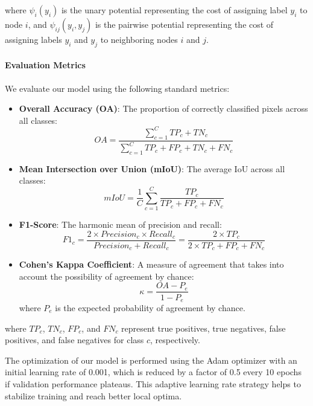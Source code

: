 \documentclass[conference]{IEEEtran}
\begin{document}
where $\psi_i(y_i)$ is the unary potential representing the cost of assigning label $y_i$ to node $i$, and $\psi_{ij}(y_i, y_j)$ is the pairwise potential representing the cost of assigning labels $y_i$ and $y_j$ to neighboring nodes $i$ and $j$.

\paragraph{Evaluation Metrics}
We evaluate our model using the following standard metrics:

\begin{itemize}
    \item \textbf{Overall Accuracy (OA)}: The proportion of correctly classified pixels across all classes:
    \begin{equation}
    OA = \frac{\sum_{c=1}^{C} TP_c + TN_c}{\sum_{c=1}^{C} TP_c + FP_c + TN_c + FN_c}
    \end{equation}
    
    \item \textbf{Mean Intersection over Union (mIoU)}: The average IoU across all classes:
    \begin{equation}
    mIoU = \frac{1}{C} \sum_{c=1}^{C} \frac{TP_c}{TP_c + FP_c + FN_c}
    \end{equation}
    
    \item \textbf{F1-Score}: The harmonic mean of precision and recall:
    \begin{equation}
    F1_c = \frac{2 \times Precision_c \times Recall_c}{Precision_c + Recall_c} = \frac{2 \times TP_c}{2 \times TP_c + FP_c + FN_c}
    \end{equation}
    
    \item \textbf{Cohen's Kappa Coefficient}: A measure of agreement that takes into account the possibility of agreement by chance:
    \begin{equation}
    \kappa = \frac{OA - P_e}{1 - P_e}
    \end{equation}
    where $P_e$ is the expected probability of agreement by chance.
\end{itemize}

where $TP_c$, $TN_c$, $FP_c$, and $FN_c$ represent true positives, true negatives, false positives, and false negatives for class $c$, respectively.

The optimization of our model is performed using the Adam optimizer with an initial learning rate of 0.001, which is reduced by a factor of 0.5 every 10 epochs if validation performance plateaus. This adaptive learning rate strategy helps to stabilize training and reach better local optima.
\end{document}
